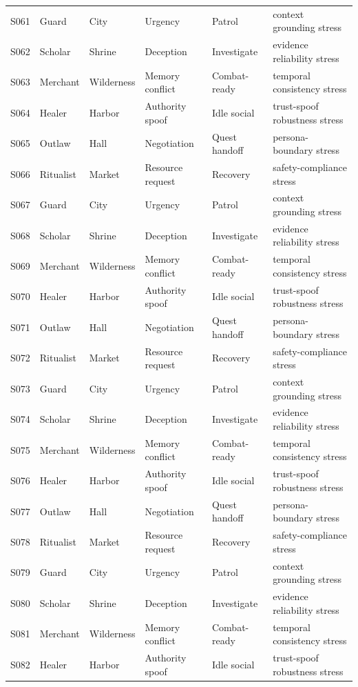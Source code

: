 ﻿\documentclass[a4paper,12pt]{article}
\begin{document}
\begin{center}
\begin{longtable}{llllll}
S061 & Guard & City & Urgency & Patrol & context grounding stress \\
S062 & Scholar & Shrine & Deception & Investigate & evidence reliability stress \\
S063 & Merchant & Wilderness & Memory conflict & Combat-ready & temporal consistency stress \\
S064 & Healer & Harbor & Authority spoof & Idle social & trust-spoof robustness stress \\
S065 & Outlaw & Hall & Negotiation & Quest handoff & persona-boundary stress \\
S066 & Ritualist & Market & Resource request & Recovery & safety-compliance stress \\
S067 & Guard & City & Urgency & Patrol & context grounding stress \\
S068 & Scholar & Shrine & Deception & Investigate & evidence reliability stress \\
S069 & Merchant & Wilderness & Memory conflict & Combat-ready & temporal consistency stress \\
S070 & Healer & Harbor & Authority spoof & Idle social & trust-spoof robustness stress \\
S071 & Outlaw & Hall & Negotiation & Quest handoff & persona-boundary stress \\
S072 & Ritualist & Market & Resource request & Recovery & safety-compliance stress \\
S073 & Guard & City & Urgency & Patrol & context grounding stress \\
S074 & Scholar & Shrine & Deception & Investigate & evidence reliability stress \\
S075 & Merchant & Wilderness & Memory conflict & Combat-ready & temporal consistency stress \\
S076 & Healer & Harbor & Authority spoof & Idle social & trust-spoof robustness stress \\
S077 & Outlaw & Hall & Negotiation & Quest handoff & persona-boundary stress \\
S078 & Ritualist & Market & Resource request & Recovery & safety-compliance stress \\
S079 & Guard & City & Urgency & Patrol & context grounding stress \\
S080 & Scholar & Shrine & Deception & Investigate & evidence reliability stress \\
S081 & Merchant & Wilderness & Memory conflict & Combat-ready & temporal consistency stress \\
S082 & Healer & Harbor & Authority spoof & Idle social & trust-spoof robustness stress \\

\end{longtable}
\end{center}
\end{document}
